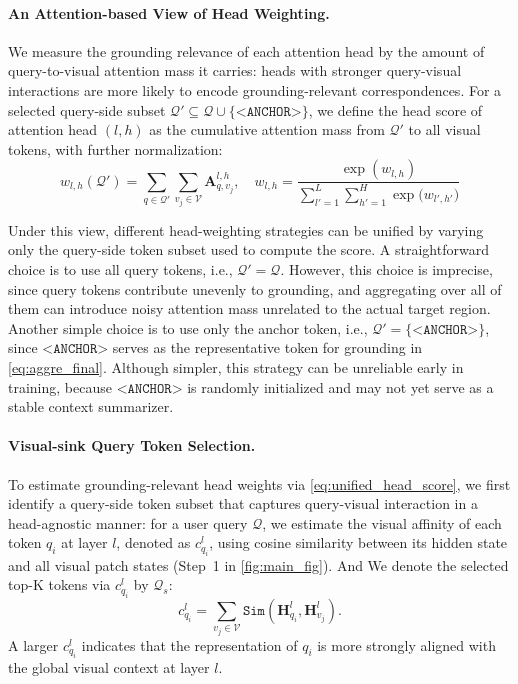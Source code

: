 \paragraph{An Attention-based View of Head Weighting.}
We measure the grounding relevance of each attention head by the amount of query-to-visual attention mass it carries: heads with stronger query-visual interactions are more likely to encode grounding-relevant correspondences.
For a selected query-side subset $\mathcal{Q}' \subseteq \mathcal{Q}\cup\{\texttt{<ANCHOR>}\}$, we define the head score of attention head $(l,h)$ as the cumulative attention mass from $\mathcal{Q}'$ to all visual tokens, with further normalization:
\begin{equation}
w_{l,h}(\mathcal{Q}')=\sum_{q\in\mathcal{Q}'}\sum_{v_j\in\mathcal{V}} \mathbf{A}^{l,h}_{q,v_j}, \quad w_{l,h}=\frac{\exp \left(w_{l,h}\right)}{\sum_{l'=1}^{L}\sum_{h'=1}^{H}\exp\!\big(w_{l',h'}\big)}
\label{eq:unified_head_score}
\end{equation}

Under this view, different head-weighting strategies can be unified by varying only the query-side token subset used to compute the score. A straightforward choice is to use all query tokens, i.e., $\mathcal{Q}'=\mathcal{Q}$. However, this choice is imprecise, since query tokens contribute unevenly to grounding, and aggregating over all of them can introduce noisy attention mass unrelated to the actual target region. Another simple choice is to use only the anchor token, i.e., $\mathcal{Q}'=\{\texttt{<ANCHOR>}\}$, since $\texttt{<ANCHOR>}$ serves as the representative token for grounding in \cref{eq:aggre_final}. Although simpler, this strategy can be unreliable early in training, because $\texttt{<ANCHOR>}$ is randomly initialized and may not yet serve as a stable context summarizer.

\paragraph{Visual-sink Query Token Selection.}
To estimate grounding-relevant head weights via  \cref{eq:unified_head_score}, we first identify a query-side token subset that captures query-visual interaction in a head-agnostic manner:
for a user query $\mathcal{Q}$, we estimate the visual affinity of each token $q_i$ at layer $l$, denoted as $c_{q_i}^l$, using cosine similarity between its hidden state and all visual patch states (Step~1 in \cref{fig:main_fig}). And We denote the selected top-K tokens via $c_{q_i}^l$ by $\mathcal{Q}_s$:
\begin{equation}
c_{q_i}^l=\sum_{v_j \in \mathcal{V}} \texttt{Sim}(\mathbf{H}^l_{q_i},\mathbf{H}^l_{v_j}).
\label{eq:similarity}
\end{equation}
A larger $c_{q_i}^l$ indicates that the representation of $q_i$ is more strongly aligned with the global visual context at layer $l$.

